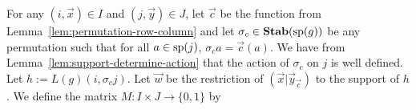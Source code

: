 \documentclass[../paper.tex]{subfiles}
\begin{document}
		

For any $(i, \vec{x}) \in I$ and $(j, \vec{y}) \in J$, let $\vec{c}$ be the
function from Lemma~\ref{lem:permutation-row-column} and let $\sigma_{c} \in
\text{\textbf{Stab}} (\text{sp} (g))$ be any permutation such that for all $a \in \text{sp}(j)$, $\sigma_{c}
a = \vec{c}(a)$. We have from Lemma~\ref{lem:support-determine-action} that the
action of $\sigma_{c}$ on $j$ is well defined. Let $h := L(g)(i, \sigma_c j)$.
Let $\vec{w}$ be the restriction of $(\vec{x} \vert \vec{y}_{\vec{c}})$ to the
support of $h$. We define the matrix $M : I \times J \rightarrow \{0,1\}$ by
\end{document}
